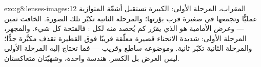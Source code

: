 \begin{solution}{exo:g8:lenses-images:12}
المقراب، المرحلة الأولى:  الكبيرة تستقبل أشعّة 
المتوازية عمليًّا وتجمعها في  صغيرة قرب بؤرتها؛
والمرحلة الثانية تكبّر تلك الصورة.   الخافت ثمين ---
و\emph{عرض}  الأمامية هو الذي يقرّر كم يُحصد منه لكل
: فالفتحة كل شيء. والمجهر، المرحلة الأولى:  شديدة
الانحناء قصيرة  معلّقة قريبًا فوق القطيرة تقذف  مكبَّرة جدًّا؛ والمرحلة الثانية تكبّر ثانية. وموضوعه
ساطع وقريب --- فما تحتاج إليه المرحلة الأولى ليس العرض بل 
الكسر. هندسة واحدة، وشهيّتان متعاكستان.
\end{solution}

